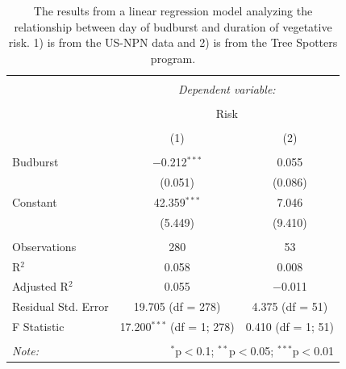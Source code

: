 \documentclass{article}\usepackage[]{graphicx}\usepackage[]{color}
\begin{document}
\begin{table}[!htbp] \centering 
  \caption{The results from a linear regression model analyzing the relationship between day of budburst and duration of vegetative risk. 1) is from the US-NPN data and 2) is from the Tree Spotters program.} 
  \label{} 
\begin{tabular}{@{\extracolsep{5pt}}lcc} 
\\[-1.8ex]\hline 
\hline \\[-1.8ex] 
 & \multicolumn{2}{c}{\textit{Dependent variable:}} \\ 
\cline{2-3} 
\\[-1.8ex] & \multicolumn{2}{c}{Risk} \\ 
\\[-1.8ex] & (1) & (2)\\ 
\hline \\[-1.8ex] 
 Budburst & $-$0.212$^{***}$ & 0.055 \\ 
  & (0.051) & (0.086) \\ 
  Constant & 42.359$^{***}$ & 7.046 \\ 
  & (5.449) & (9.410) \\ 
 \hline \\[-1.8ex] 
Observations & 280 & 53 \\ 
R$^{2}$ & 0.058 & 0.008 \\ 
Adjusted R$^{2}$ & 0.055 & $-$0.011 \\ 
Residual Std. Error & 19.705 (df = 278) & 4.375 (df = 51) \\ 
F Statistic & 17.200$^{***}$ (df = 1; 278) & 0.410 (df = 1; 51) \\ 
\hline 
\hline \\[-1.8ex] 
\textit{Note:}  & \multicolumn{2}{r}{$^{*}$p$<$0.1; $^{**}$p$<$0.05; $^{***}$p$<$0.01} \\ 
\end{tabular} 
\end{table} 
\end{document}
